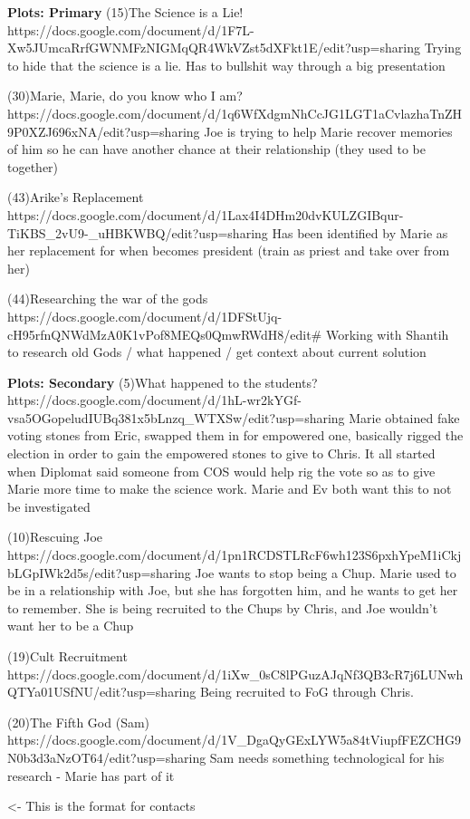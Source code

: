 \documentclass[char]{GL2020}
\begin{document}
\textbf{Plots: Primary}
(15)The Science is a Lie!
https://docs.google.com/document/d/1F7L-Xw5JUmcaRrfGWNMFzNIGMqQR4WkVZst5dXFkt1E/edit?usp=sharing
Trying to hide that the science is a lie.  Has to bullshit way through a big presentation 

(30)Marie, Marie, do you know who I am?
https://docs.google.com/document/d/1q6WfXdgmNhCcJG1LGT1aCvlazhaTnZH9P0XZJ696xNA/edit?usp=sharing
Joe is trying to help Marie recover memories of him so he can have another chance at their relationship (they used to be together)

(43)Arike's Replacement
https://docs.google.com/document/d/1Lax4I4DHm20dvKULZGIBqur-TiKBS_2vU9-_uHBKWBQ/edit?usp=sharing
Has been identified by Marie as her replacement for when becomes president (train as priest and take over from her)

(44)Researching the war of the gods
https://docs.google.com/document/d/1DFStUjq-cH95rfnQNWdMzA0K1vPof8MEQs0QmwRWdH8/edit#
Working with Shantih to research old Gods / what happened / get context about current solution

\textbf{Plots: Secondary}
(5)What happened to the students?
https://docs.google.com/document/d/1hL-wr2kYGf-vsa5OGopeludIUBq381x5bLnzq_WTXSw/edit?usp=sharing
Marie obtained fake voting stones from Eric, swapped them in for empowered one, basically rigged the election in order to gain the empowered stones to give to Chris.  It all started when Diplomat said someone from COS \cEvil{} would help rig the vote so as to give Marie more time to make the science work.  Marie and Ev both want this to not be investigated

(10)Rescuing Joe
https://docs.google.com/document/d/1pn1RCDSTLRcF6wh123S6pxhYpeM1iCkjbLGpIWk2d5s/edit?usp=sharing
Joe wants to stop being a Chup.  Marie used to be in a relationship with Joe, but she has forgotten him, and he wants to get her to remember.  She is being recruited to the Chups by Chris, and Joe wouldn't want her to be a Chup

(19)Cult Recruitment
https://docs.google.com/document/d/1iXw_0sC8lPGuzAJqNf3QB3cR7j6LUNwhQTYa01USfNU/edit?usp=sharing
Being recruited to FoG through Chris.  

(20)The Fifth God (Sam)
https://docs.google.com/document/d/1V_DgaQyGExLYW5a84tViupfFEZCHG9N0b3d3aNzOT64/edit?usp=sharing
Sam needs something technological for his research - Marie has part of it

\begin{itemz}[Goals]
	\item 
\end{itemz}

\begin{itemz}[Notes]
	\item 
\end{itemz}

\begin{contacts}
	\contact{\cTest{}} <- This is the format for contacts 
\end{contacts}
\end{document}
